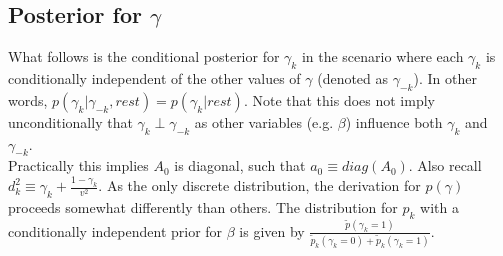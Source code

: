 \documentclass[11pt]{article}
\begin{document}
\subsection{Posterior for $\gamma$}
What follows is the conditional posterior for $\gamma_{k}$ in the scenario where each $\gamma_{k}$ is conditionally independent of the other values of $\gamma$ (denoted as $\gamma_{-k}$). In other words, $p\left(\gamma_{k}|\gamma_{-k},rest\right)=p\left(\gamma_{k}|rest\right)$. Note that this does not imply unconditionally that $\gamma_{k}\perp\gamma_{-k}$ as other variables (e.g. $\beta$) influence both $\gamma_{k}$ and $\gamma_{-k}$. \\

Practically this implies $A_{0}$ is diagonal, such that $a_{0}\equiv diag\left(A_{0}\right)$. Also recall $d_{k}^{2}\equiv\gamma_{k}+\frac{1-\gamma_{k}}{v^{2}}$. As the only discrete distribution, the derivation for $p\left(\gamma\right)$ proceeds somewhat differently than others. The distribution for $p_{k}$ with a conditionally independent prior for $\beta$ is given by $\frac{\tilde{p}\left(\gamma_{k}=1\right)}{\tilde{p}_{k}\left(\gamma_{k}=0\right)+\tilde{p}_{k}\left(\gamma_{k}=1\right)}$. 
\end{document}
